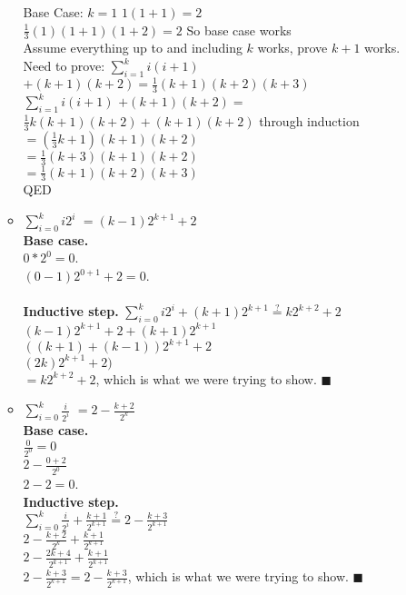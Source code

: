 \documentclass[12pt]{article}
\begin{document}
\begin{enumerate}
\begin{itemize}
Base Case: $k=1$
$1(1+1) = 2$\\
$\frac{1}{3}(1)(1+1)(1+2) = 2$ So base case works\\

Assume everything up to and including $k$ works, prove $k+1$ works.\\
Need to prove: $\displaystyle\sum\limits_{i=1}^k i(i+1)$ $+(k+1)(k+2) =
\frac{1}{3}(k+1)(k+2)(k+3)$\\
$\displaystyle\sum\limits_{i=1}^k i(i+1)$ $+(k+1)(k+2) =$\\
$\frac{1}{3}k(k+1)(k+2)+(k+1)(k+2)$ through induction\\
$= (\frac{1}{3}k+1)(k+1)(k+2)$\\
$= \frac{1}{3}(k+3)(k+1)(k+2)$\\
$= \frac{1}{3}(k+1)(k+2)(k+3)$\\
QED
\item $\displaystyle\sum\limits_{i=0}^k i2^i $ $= (k-1)2^{k+1}+2$ \\

  \textbf{Base case.} \\ 
    $0 * 2^0 = 0$. \\
    $(0 - 1)2^{0 + 1} + 2 = 0$. \\ \\
  \textbf{Inductive step.}
    $\sum_{i=0}^k i2^i + (k + 1)2^{k+1} \stackrel{?}{=} k2^{k+2} + 2$ \\
    $(k - 1)2^{k+1} + 2 + (k + 1)2^{k+1}$ \\
    $((k + 1) + (k - 1))2^{k+1} + 2$ \\
    $(2k)2^{k+1}+2)$ \\
    $= k2^{k+2} + 2$, which is what we were trying to show. $\blacksquare$

\item $\displaystyle\sum\limits_{i=0}^k \frac{i}{2^i} $ $= 2-\frac{k+2}{2^k}$ \\

  \textbf{Base case.} \\
    $\frac{0}{2^0} = 0$ \\
    $2 - \frac{0 + 2}{2^0}$ \\
    $2 - 2 = 0$.\\

  \textbf{Inductive step.} \\
    $\displaystyle \sum_{i=0}^k \frac{i}{2^i} + \frac{k+1}{2^{k+1}} \stackrel{?}{=} 2 - \frac{k+3}{2^{k + 1}}$ \\
    $\displaystyle 2 - \frac{k+2}{2^k} + \frac{k+1}{2^{k+1}}$\\
    $\displaystyle 2 - \frac{2k+4}{2^{k+1}} + \frac{k+1}{2^{k+1}}$\\
    $\displaystyle 2 - \frac{k+3}{2^{k+1}} = 2 - \frac{k+3}{2^{k+1}}$, which is what we were trying to show. $\blacksquare$


\end{itemize}
\end{enumerate}
\end{document}
